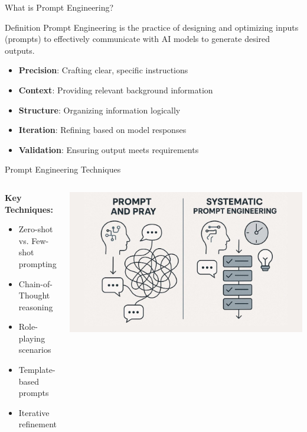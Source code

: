 \documentclass{beamer}
\begin{document}
\begin{frame}[t]{What is Prompt Engineering?}
    \begin{block}{Definition}
        Prompt Engineering is the practice of designing and optimizing inputs (prompts) to effectively communicate with AI models to generate desired outputs.
    \end{block}
    
    \begin{itemize}
        \item \textbf{Precision}: Crafting clear, specific instructions
        \item \textbf{Context}: Providing relevant background information
        \item \textbf{Structure}: Organizing information logically
        \item \textbf{Iteration}: Refining based on model responses
        \item \textbf{Validation}: Ensuring output meets requirements
    \end{itemize}
\end{frame}

\begin{frame}[t]{Prompt Engineering Techniques}
    \begin{columns}
        \begin{column}{0.6\textwidth}
            \textbf{Key Techniques:}
            \begin{itemize}
                \item Zero-shot vs. Few-shot prompting
                \item Chain-of-Thought reasoning
                \item Role-playing scenarios
                \item Template-based prompts
                \item Iterative refinement
            \end{itemize}
        \end{column}
        \begin{column}{0.4\textwidth}
            \centering
            \includegraphics[width=\textwidth]{images/prompt.jpeg} %
        \end{column}
    \end{columns}
\end{frame}
\end{document}
